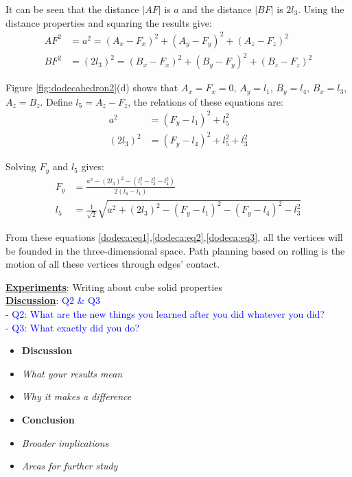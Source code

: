 It can be seen that the distance $|AF|$ is $a$ and the distance $|BF|$ is $2l_3$. Using the distance properties and squaring the results give:
\begin{equation} 
\label{dodeca:eq1}
\begin{split}
AF^2 & = a^2 = (A_x-F_x)^2 + (A_y-F_y)^2 + (A_z-F_z)^2 \\
BF^2 & = (2l_3)^2 = (B_x-F_x)^2 + (B_y-F_y)^2 + (B_z-F_z)^2
\end{split}
\end{equation}

Figure \ref{fig:dodecahedron2}(d) shows that $A_x = F_x = 0$, $A_y = l_1$, $B_y = l_4$, $B_x = l_3$, $A_z = B_z$. Define $l_5=A_z-F_z$, the relations of these equations are:
\begin{equation} 
\label{dodeca:eq2}
\begin{split}
a^2 & = (F_y-l_1)^2 + l_5^2\\
(2l_3)^2 & = (F_y-l_4)^2 + l_5^2 + l_3^2
\end{split}
\end{equation}

Solving $F_y$ and $l_5$ gives:
\begin{equation} 
\label{dodeca:eq3}
\begin{split}
F_y & = \frac{a^2-(2l_3)^2-(l_1^2-l_3^2-l_4^2)}{2(l_4-l_1)} \\
l_5 & = \frac{1}{\sqrt{2}}\sqrt{a^2+(2l_3)^2-(F_y-l_1)^2-(F_y-l_4)^2-l_3^2}
\end{split}
\end{equation}

From these equations \ref{dodeca:eq1},\ref{dodeca:eq2},\ref{dodeca:eq3}, all the vertices will be founded in the three-dimensional space. Path planning based on rolling is the motion of all these vertices through edges' contact.


%
\newpage
\noindent\uline{\textbf{Experiments}}:
Writing about cube solid properties\\

\noindent\uline{\textbf{Discussion}}: 
\textcolor{blue}{Q2 \& Q3\\
- Q2: What are the new things you learned after you did whatever you did?\\
- Q3: What exactly did you do?}\\

\begin{itemize}
\color{red}
\item \textbf{Discussion}
\item \textit{What your results mean}
\item \textit{Why it makes a difference}
\item \textbf{Conclusion}
\item \textit{Broader implications}
\item \textit{Areas for further study}
\end{itemize}





